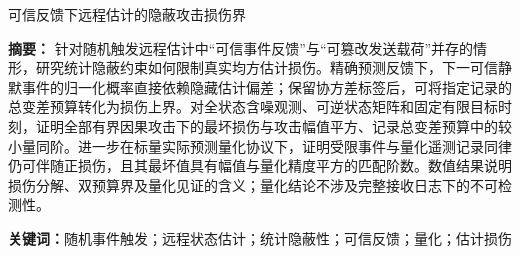 \documentclass[UTF8,fontset=windows,zihao=5]{ctexart}
\begin{document}
\begin{center}
{\heiti{}可信反馈下远程估计的隐蔽攻击损伤界\par}
\end{center}

\noindent\textbf{摘\quad 要：}
针对随机触发远程估计中“可信事件反馈”与“可篡改发送载荷”并存的情形，研究统计隐蔽约束如何限制真实均方估计损伤。精确预测反馈下，下一可信静默事件的归一化概率直接依赖隐藏估计偏差；保留协方差标签后，可将指定记录的总变差预算转化为损伤上界。对全状态含噪观测、可逆状态矩阵和固定有限目标时刻，证明全部有界因果攻击下的最坏损伤与攻击幅值平方、记录总变差预算中的较小量同阶。进一步在标量实际预测量化协议下，证明受限事件与量化遥测记录同律仍可伴随正损伤，且其最坏值具有幅值与量化精度平方的匹配阶数。数值结果说明损伤分解、双预算界及量化见证的含义；量化结论不涉及完整接收日志下的不可检测性。

\smallskip
\noindent\textbf{关键词：}随机事件触发；远程状态估计；统计隐蔽性；可信反馈；量化；估计损伤







\appendix




\end{document}
